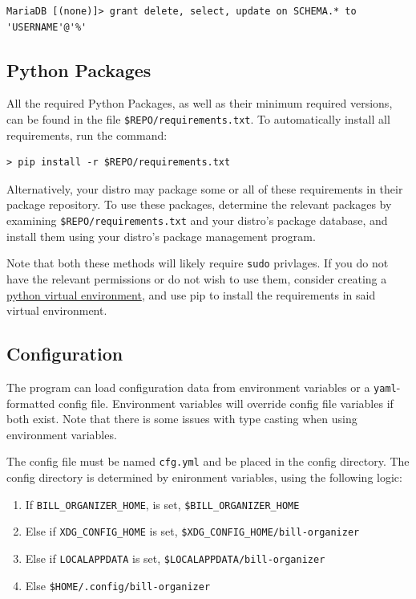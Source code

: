 \documentclass{article}
\begin{document}
\begin{verbatim}
MariaDB [(none)]> grant delete, select, update on SCHEMA.* to 'USERNAME'@'%'
\end{verbatim}


\subsection{Python Packages}
\label{sec:admin:pip}

All the required Python Packages, as well as their minimum required versions, can be found in the file \verb_$REPO/requirements.txt_. To automatically install all requirements, run the command:
\begin{verbatim}
> pip install -r $REPO/requirements.txt
\end{verbatim} 

Alternatively, your distro may package some or all of these requirements in their package repository. To use these packages, determine the relevant packages by examining \verb_$REPO/requirements.txt_ and your distro's package database, and install them using your distro's package management program. 

Note that both these methods will likely require \verb_sudo_ privlages. If you do not have the relevant permissions or do not wish to use them, consider creating a \href{https://docs.python.org/3/tutorial/venv.html}{python virtual environment}, and use pip to install the requirements in said virtual environment.

\subsection{Configuration}
\label{sec:admin:conf}

The program can load configuration data from environment variables or a \verb"yaml"-formatted config file. Environment variables will override config file variables if both exist. Note that there is some issues with type casting when using environment variables.

The config file must be named \verb"cfg.yml" and be placed in the config directory. The config directory is determined by enironment variables, using the following logic:

\begin{enumerate}
    \item If \verb"BILL_ORGANIZER_HOME", is set, \verb"$BILL_ORGANIZER_HOME"
    \item Else if \verb"XDG_CONFIG_HOME" is set, \verb"$XDG_CONFIG_HOME/bill-organizer"
    \item Else if \verb"LOCALAPPDATA" is set, \verb"$LOCALAPPDATA/bill-organizer"
    \item Else \verb"$HOME/.config/bill-organizer"
\end{enumerate}
\end{document}
